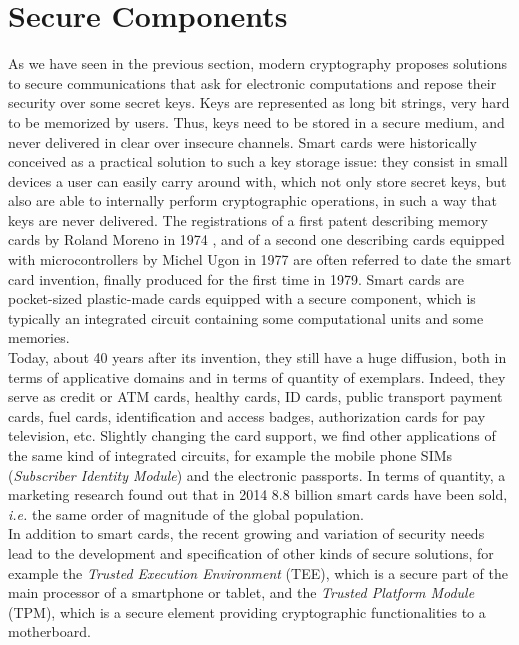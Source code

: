 \section{Secure Components}

As we have seen in the previous section, modern cryptography proposes solutions to secure communications that ask for electronic computations and repose their security over some secret keys. Keys are represented as long bit strings, very hard to be memorized by users. Thus, keys need to be stored in a secure medium, and never delivered in clear over insecure channels. Smart cards were historically conceived as a practical solution to such a key storage issue: they consist in small devices a user can easily carry around with, which not only store secret keys, but also are able to internally perform cryptographic operations, in such a way that keys are never delivered. The registrations of a first patent describing memory cards by Roland Moreno in 1974 \cite{moreno}, and of a second one describing cards equipped with microcontrollers by Michel Ugon in 1977 \cite{ugon} are often referred to date the smart card invention, finally produced for the first time in 1979. Smart cards are pocket-sized plastic-made cards equipped with a secure component, which is typically an integrated circuit containing some computational units and some memories.\\

Today, about 40 years after its invention, they still have a huge diffusion, both in terms of applicative domains and in terms of quantity of exemplars. Indeed, they serve as credit or ATM cards, healthy cards, ID cards, public transport payment cards, fuel cards, identification and access badges, authorization cards for pay television, etc. Slightly changing the card support, we find other applications of the same kind of integrated circuits, for example the  mobile phone SIMs (\emph{Subscriber Identity Module}) and the electronic passports. In terms of quantity, a marketing research \cite{ABI} found out that in 2014 8.8 billion smart cards have been sold, \emph{i.e.} the same order of magnitude of the global population. \\

In addition to smart cards, the recent growing and variation of security needs lead to the development and specification of other kinds of secure solutions, for example the \emph{Trusted Execution Environment} (TEE), which is a secure part of the main processor of a smartphone or tablet, and the \emph{Trusted Platform Module} 
(TPM), which is a secure element providing cryptographic functionalities to a motherboard. 

